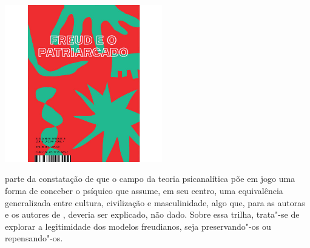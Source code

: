 \pagebreak

\hspace{.5cm}

\begin{center}
\hspace*{-.5cm}\includegraphics[width=68.5mm]{./imgs/freud.jpg}
\end{center}

\hspace*{-7cm}\hrulefill\hspace*{-7cm}

\medskip

 parte da constatação de que o campo da teoria psicanalítica põe em jogo uma forma de conceber o psíquico que assume, em seu centro, uma equivalência generalizada entre cultura, civilização e masculinidade, algo que, para as autoras e os autores de {}, deveria ser explicado, não dado. Sobre essa trilha, trata"-se de explorar a legitimidade dos modelos freudianos, seja preservando"-os ou repensando"-os.

\vfill

\hspace*{-.4cm}\begin{minipage}[c]{1\linewidth}
\small{
{}}
\end{minipage}

